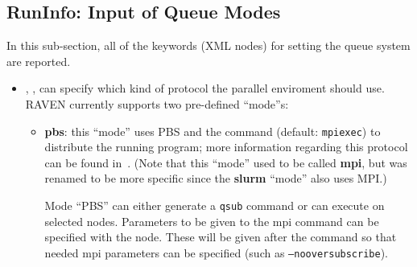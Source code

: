 \subsection{RunInfo: Input of Queue Modes}
\label{subsec:runinfoModes}
In this sub-section, all of the keywords (XML nodes) for setting the queue
system are reported.
\begin{itemize}
\item {}, , can specify which kind
of protocol the parallel enviroment should use.
%
RAVEN currently supports two pre-defined ``mode''s:
  \begin{itemize}
    \item \textbf{pbs}: this ``mode'' uses PBS and the   command (default: \texttt{mpiexec})
      to distribute the running program; more information regarding this protocol can be found
      in~\cite{MPI}.  (Note that this ``mode'' used to be called \textbf{mpi}, but was renamed to be more specific since the \textbf{slurm} ``mode'' also uses MPI.)

      Mode ``PBS''  can either generate a \texttt{qsub} command or can execute
      on selected nodes.
      Parameters to be given to the mpi command can be specified with the  node.  These will be given after the   command so that needed mpi parameters can be specified (such as \texttt{--nooversubscribe}).


\end{itemize}
\end{itemize}
